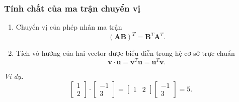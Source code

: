 \begin{frame}
    \frametitle{Tính chất của ma trận chuyển vị}
    \begin{enumerate}
        \item Chuyển vị của phép nhân ma trận
        \[(\mathbf{AB})^T =\mathbf{B}^T \mathbf{A}^T .\]
        \item Tích vô hướng của hai vector được biểu diễn trong hệ cơ sở trực chuẩn
        \[\mathbf{v}\cdot \mathbf{u}=\mathbf{v}^T \mathbf{u}=\mathbf{u}^T \mathbf{v}.\] 
    \end{enumerate}
    \emph{Ví dụ.}
    \[\begin{bmatrix}
    1\\2
\end{bmatrix}\cdot\begin{bmatrix}
    -1\\3
\end{bmatrix}=\begin{bmatrix}
    1&2
\end{bmatrix}\begin{bmatrix}
    -1\\3
\end{bmatrix}=5.\]
\end{frame}